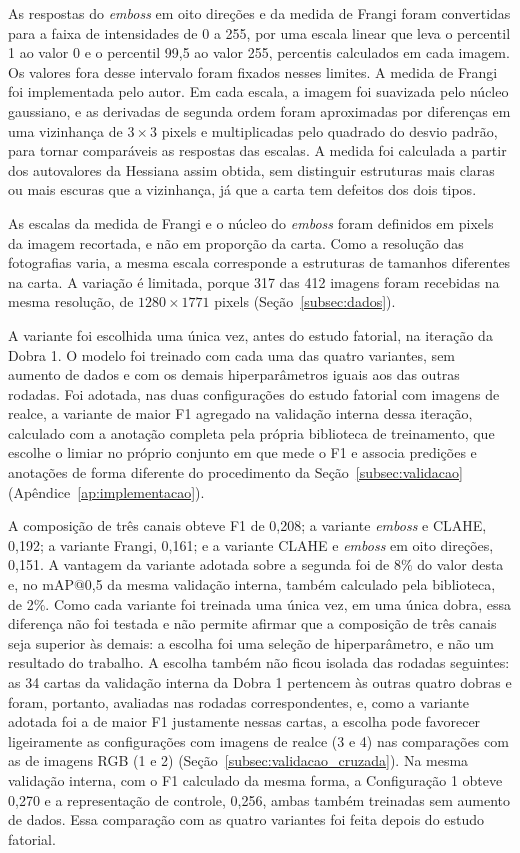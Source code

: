 \documentclass[
    12pt,                %
    openright,           %
    oneside,             %
    a4paper,             %
    english,             %
    brazil               %
]{abntex2}
\begin{document}
As respostas do \textit{emboss} em oito
direções e da medida de Frangi foram convertidas para a faixa de
intensidades de 0 a 255, por uma escala linear que leva o percentil 1
ao valor 0 e o percentil 99,5 ao valor 255, percentis calculados em
cada imagem. Os valores fora desse intervalo foram fixados nesses
limites. A medida de Frangi foi implementada pelo autor. Em cada
escala, a imagem foi suavizada pelo núcleo gaussiano, e as derivadas
de segunda ordem foram aproximadas por diferenças em uma vizinhança de
$3 \times 3$ pixels e multiplicadas pelo quadrado do desvio padrão,
para tornar comparáveis as respostas das escalas. A medida foi
calculada a partir dos autovalores da Hessiana assim obtida, sem
distinguir estruturas mais claras ou mais escuras que a vizinhança, já
que a carta tem defeitos dos dois tipos.

As escalas da medida de Frangi e o núcleo do \textit{emboss} foram
definidos em pixels da imagem recortada, e não em proporção da carta.
Como a resolução das fotografias varia, a mesma escala corresponde a estruturas de tamanhos
diferentes na carta. A variação é limitada, porque 317 das 412 imagens
foram recebidas na mesma resolução, de $1280 \times 1771$ pixels
(Seção~\ref{subsec:dados}).

A variante foi escolhida uma única vez, antes do estudo fatorial, na
iteração da Dobra 1. O modelo foi treinado com cada uma das
quatro variantes, sem aumento de dados e com os demais hiperparâmetros iguais aos das outras
rodadas. Foi adotada, nas duas configurações do estudo fatorial com
imagens de realce, a variante de maior F1
agregado na validação interna dessa iteração, calculado com a anotação
completa pela própria biblioteca de treinamento, que escolhe o limiar no próprio conjunto em que mede o F1 e associa predições e anotações de forma diferente do procedimento da Seção~\ref{subsec:validacao} (Apêndice~\ref{ap:implementacao}).

A composição de três canais obteve F1 de 0,208; a variante
\textit{emboss} e CLAHE, 0,192; a variante Frangi, 0,161; e a variante
CLAHE e \textit{emboss} em oito direções, 0,151. A vantagem da
variante adotada sobre a segunda foi de 8\% do valor desta e, no
mAP@0,5 da mesma validação interna, também calculado pela biblioteca,
de 2\%. Como cada variante foi
treinada uma única vez, em uma única dobra, essa diferença não foi
testada e não permite afirmar que a composição de três canais seja
superior às demais: a escolha foi uma seleção de hiperparâmetro, e não
um resultado do trabalho. A escolha também não ficou isolada das rodadas
seguintes: as 34 cartas da validação interna da Dobra 1 pertencem às
outras quatro dobras e foram, portanto, avaliadas nas rodadas
correspondentes, e, como a variante adotada foi a de maior F1
justamente nessas cartas, a escolha pode favorecer ligeiramente as
configurações com imagens de realce (3 e 4) nas comparações com as de
imagens RGB (1 e 2) (Seção~\ref{subsec:validacao_cruzada}). Na mesma
validação interna, com o F1 calculado da mesma forma, a Configuração 1
obteve 0,270 e a representação de controle, 0,256, ambas também
treinadas sem aumento de dados. Essa comparação com as quatro variantes
foi feita depois do estudo fatorial.
\end{document}
